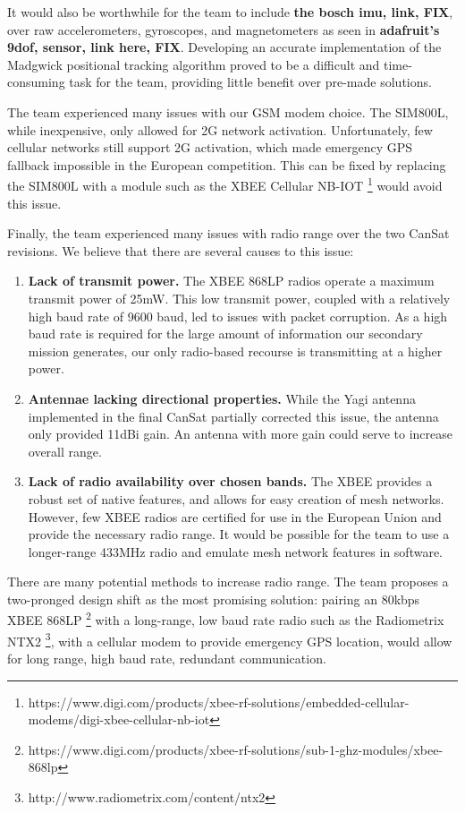 \documentclass[]{report}
\begin{document}
	It would also be worthwhile for the team to include \textbf{the bosch imu, link, FIX}, over raw accelerometers, gyroscopes, and magnetometers as seen in \textbf{adafruit's 9dof, sensor, link here, FIX}. Developing an accurate implementation of the Madgwick positional tracking algorithm proved to be a difficult and time-consuming task for the team, providing little benefit over pre-made solutions.
	
	The team experienced many issues with our GSM modem choice. The SIM800L, while inexpensive, only allowed for 2G network activation. Unfortunately, few cellular networks still support 2G activation, which made emergency GPS fallback impossible in the European competition. This can be fixed by replacing the SIM800L with a module such as the XBEE Cellular NB-IOT \footnote{https://www.digi.com/products/xbee-rf-solutions/embedded-cellular-modems/digi-xbee-cellular-nb-iot} would avoid this issue.
	
	Finally, the team experienced many issues with radio range over the two CanSat revisions. We believe that there are several causes to this issue:
	
	\begin{enumerate}
		\item \textbf{Lack of transmit power.} The XBEE 868LP radios operate a maximum transmit power of 25mW. This low transmit power, coupled with a relatively high baud rate of 9600 baud, led to issues with packet corruption. As a high baud rate is required for the large amount of information our secondary mission generates, our only radio-based recourse is transmitting at a higher power. \\
		\item \textbf{Antennae lacking directional properties.} While the Yagi antenna implemented in the final CanSat partially corrected this issue, the antenna only provided 11dBi gain. An antenna with more gain could serve to increase overall range. \\
		\item \textbf{Lack of radio availability over chosen bands.} The XBEE provides a robust set of native features, and allows for easy creation of mesh networks. However, few XBEE radios are certified for use in the European Union and provide the necessary radio range. It would be possible for the team to use a longer-range 433MHz radio and emulate mesh network features in software.
	\end{enumerate}
	
	There are many potential methods to increase radio range. The team proposes a two-pronged design shift as the most promising solution: pairing an 80kbps XBEE 868LP \footnote{https://www.digi.com/products/xbee-rf-solutions/sub-1-ghz-modules/xbee-868lp} with a long-range, low baud rate radio such as the Radiometrix NTX2 \footnote{http://www.radiometrix.com/content/ntx2}, with a cellular modem to provide emergency GPS location, would allow for long range, high baud rate, redundant communication.
	
\end{document}

